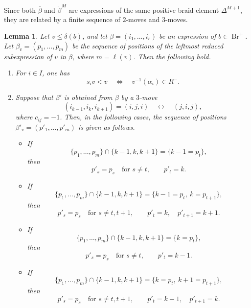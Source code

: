 \documentclass[12pt, reqno]{amsart}
\theoremstyle{plain}
\newtheorem{lemma}[theorem]{Lemma}
\theoremstyle{definition}
\numberwithin{equation}{section}
\newcommand{\Br}{{\operatorname{Br}}}
\begin{document}
Since both \(\overline{\beta}\) and \(\dot{\beta}^M\) are expressions of the
same positive braid element \(\Delta^{M+1}\), they are related by a finite
sequence of \(2\)-moves and \(3\)-moves.
\begin{lemma}\label{lem:beta3move}
Let \(v\le \delta(b)\), and let
\(
\beta=(i_1,\dots,i_r)
\)
be an expression of \(b\in \Br^+\). Let
\(
\beta_v=(p_1,\dots,p_m)
\)
be the sequence of positions of the leftmost reduced subexpression of \(v\) in
\(\beta\), where \(m=\ell(v)\). Then the following hold.

\begin{enumerate}
\item For \(i\in I\), one has
\[
s_iv<v
\quad\Longleftrightarrow\quad
v^{-1}(\alpha_i)\in R^-.
\]

\item Suppose that \(\beta'\) is obtained from \(\beta\) by a \(3\)-move
\[
(i_{k-1},i_k,i_{k+1})=(i,j,i)
\quad\longleftrightarrow\quad
(j,i,j),
\]
where \(c_{ij}=-1\). Then, in the following cases, the sequence of positions
\(\beta'_v=(p'_1,\dots,p'_m)\) is given as follows.

\begin{itemize}
\item[(1)] If
\[
\{p_1,\dots,p_m\}\cap\{k-1,k,k+1\}=\{k-1=p_t\},
\]
then
\[
p'_s=p_s \quad \text{for }s\neq t,
\qquad
p'_t=k.
\]

\item[(2)] If
\[
\{p_1,\dots,p_m\}\cap\{k-1,k,k+1\}
=
\{k-1=p_t,\ k=p_{t+1}\},
\]
then
\[
p'_s=p_s \quad \text{for }s\neq t,t+1,
\qquad
p'_t=k,\quad p'_{t+1}=k+1.
\]

\item[(3)] If
\[
\{p_1,\dots,p_m\}\cap\{k-1,k,k+1\}=\{k=p_t\},
\]
then
\[
p'_s=p_s \quad \text{for }s\neq t,
\qquad
p'_t=k-1.
\]

\item[(4)] If
\[
\{p_1,\dots,p_m\}\cap\{k-1,k,k+1\}
=
\{k=p_t,\ k+1=p_{t+1}\},
\]
then
\[
p'_s=p_s \quad \text{for }s\neq t,t+1,
\qquad
p'_t=k-1,\quad p'_{t+1}=k.
\]
\end{itemize}
\end{enumerate}
\end{lemma}
\end{document}
